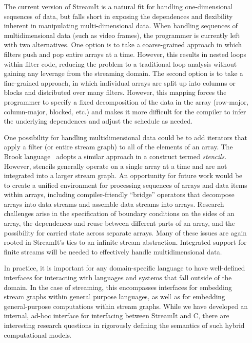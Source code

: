 \newpage
{}  The current version of StreamIt is
  a natural fit for handling one-dimensional sequences of data, but
  falls short in exposing the dependences and flexibility inherent in
  manipulating multi-dimensional data.  When handling sequences of
  multidimensional data (such as video frames), the programmer is
  currently left with two alternatives.  One option is to take a
  coarse-grained approach in which filters push and pop entire arrays
  at a time.  However, this results in nested loops within filter
  code, reducing the problem to a traditional loop analysis without
  gaining any leverage from the streaming domain.  The second option
  is to take a fine-grained approach, in which individual arrays are
  split up into columns or blocks and distributed over many filters.
  However, this mapping forces the programmer to specify a fixed
  decomposition of the data in the array (row-major, column-major,
  blocked, etc.) and makes it more difficult for the compiler to infer
  the underlying dependences and adjust the schedule as needed.

  One possibility for handling multidimensional data could be to add
  iterators that apply a filter (or entire stream graph) to all of the
  elements of an array.  The Brook language~\cite{brook04} adopts a
  similar approach in a construct termed {\it stencils}.  However,
  stencils generally operate on a single array at a time and are not
  integrated into a larger stream graph.  An opportunity for future
  work would be to create a unified environment for processing
  sequences of arrays and data items within arrays, including
  compiler-friendly ``bridge'' operators that decompose arrays into
  data streams and assemble data streams into arrays.  Research
  challenges arise in the specification of boundary conditions on the
  sides of an array, the dependences and reuse between different parts
  of an array, and the possibility for carried state across separate
  arrays.  Many of these issues are again rooted in StreamIt's ties to
  an infinite stream abstraction.  Integrated support for finite
  streams will be needed to effectively handle multidimensional data.

  In practice, it is important for any
  domain-specific language to have well-defined interfaces for
  interacting with languages and systems that fall outside of the
  domain.  In the case of streaming, this encompasses interfaces for
  embedding stream graphs within general purpose languages, as well as
  for embedding general-purpose computations within stream graphs.
  While we have developed an internal, ad-hoc interface for
  interfacing between StreamIt and C, there are interesting research
  questions in rigorously defining the semantics of such hybrid
  computational models. 

